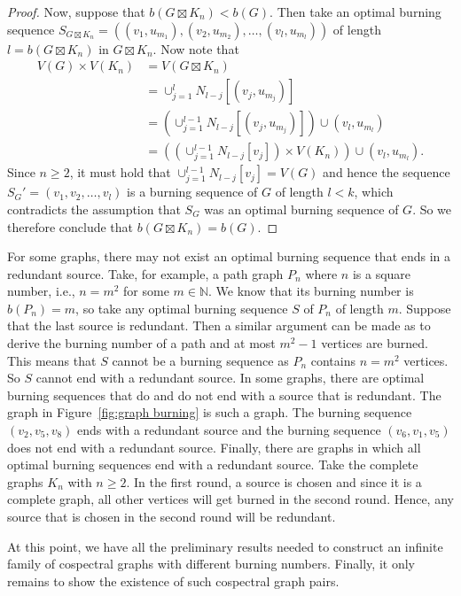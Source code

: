 \documentclass[12pt]{article}
\theoremstyle{plain}
\theoremstyle{definition}
\theoremstyle{remark}
\begin{document}
\begin{proof}
    Now, suppose that $b(G\boxtimes K_n) < b(G)$. Then take an optimal burning sequence \linebreak $S_{G\boxtimes K_n} = ((v_1,u_{m_1}),(v_2,u_{m_2}),\dots,(v_l,u_{m_l}))$ of length $l= b(G\boxtimes K_n)$ in $G\boxtimes K_n$. Now note that
    \begin{align*}
        V(G)\times V(K_n) &= V(G\boxtimes K_n)\\
        &= \cup_{j=1}^l N_{l-j}[(v_j,u_{m_j})]\\
        &= \left( \cup_{j=1}^{l-1} N_{l-j}[(v_j,u_{m_j})]\right) \cup (v_l,u_{m_l})\\
        &= \left( \left( \cup_{j=1}^{l-1}N_{l-j}[v_j] \right) \times V(K_n) \right) \cup (v_l,u_{m_l}).
    \end{align*}
    Since $n\geq 2$, it must hold that $\cup_{j=1}^{l-1}N_{l-j}[v_j] = V(G)$ and hence the sequence $S_{G}' = (v_1,v_2,\dots,v_l)$ is a burning sequence of $G$ of length $l<k$, which contradicts the assumption that $S_G$ was an optimal burning sequence of $G$. So we therefore conclude that $b(G\boxtimes K_n)=b(G)$.
\end{proof}

For some graphs, there may not exist an optimal burning sequence that ends in a redundant source. 
Take, for example, a path graph $P_n$ where $n$ is a square number, i.e., $n=m^2$ for some $m\in \mathbb{N}$. 
We know that its burning number is $b(P_n) = m$, so take any optimal burning sequence $S$ of $P_n$ of length $m$. Suppose that the last source is redundant. Then a similar argument can be made as to derive the burning number of a path and at most $m^2 - 1$ vertices are burned.
This means that $S$ cannot be a burning sequence as $P_n$ contains $n=m^2$ vertices.
So $S$ cannot end with a redundant source.
In some graphs, there are optimal burning sequences that do and do not end with a source that is redundant.
The graph in Figure~\ref{fig:graph burning} is such a graph.
The burning sequence $(v_2,v_5,v_8)$ ends with a redundant source and the burning sequence $(v_6,v_1,v_5)$ does not end with a redundant source.
Finally, there are graphs in which all optimal burning sequences end with a redundant source.
Take the complete graphs $K_n$ with $n\geq 2$. In the first round, a source is chosen and since it is a complete graph, all other vertices will get burned in the second round. Hence, any source that is chosen in the second round will be redundant.

At this point, we have all the preliminary results needed to construct an infinite family of cospectral graphs with different burning numbers. Finally, it only remains to show the existence of such cospectral graph pairs.
\end{document}
